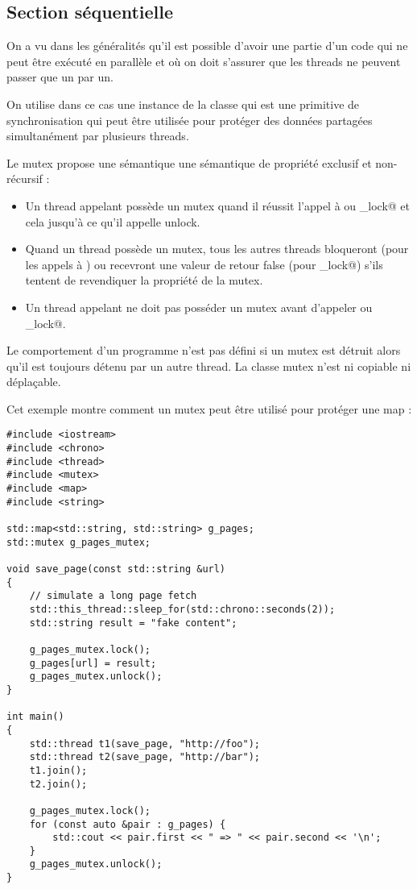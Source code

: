\documentclass[fleqn,11pt]{article}
\begin{document}
\subsection{Section séquentielle}

On a vu dans les généralités qu'il est possible d'avoir une partie d'un code qui ne peut être exécuté en parallèle et où on doit
s'assurer que les threads ne peuvent passer que un par un.

On utilise dans ce cas une instance de la classe \lstinline@mutex@ qui est une primitive de synchronisation qui peut être utilisée
pour protéger des données partagées simultanément par plusieurs threads.

Le mutex propose une sémantique une sémantique de propriété exclusif et non-récursif :

\begin{itemize}
\item Un thread appelant possède un mutex quand il réussit l'appel à 
\lstinline@lock@ ou \lstinline@try_lock@ et cela jusqu'à ce qu'il appelle unlock.
\item Quand un thread possède un mutex, tous les autres threads bloqueront (pour les appels à \lstinline@lock@) ou 
      recevront une valeur de retour false (pour \lstinline@try_lock@) s'ils tentent de revendiquer la propriété de la mutex.
\item Un thread appelant ne doit pas posséder un mutex avant d'appeler \lstinline@lock@ ou \lstinline@try_lock@. 
\end{itemize}

Le comportement d'un programme n'est pas défini si un mutex est détruit alors qu'il est toujours détenu par un autre thread. 
La classe mutex n'est ni copiable ni déplaçable.

Cet exemple montre comment un mutex peut être utilisé pour protéger une map :

\begin{lstlisting}
#include <iostream>
#include <chrono>
#include <thread>
#include <mutex>
#include <map>
#include <string>
 
std::map<std::string, std::string> g_pages;
std::mutex g_pages_mutex;
 
void save_page(const std::string &url)
{
    // simulate a long page fetch
    std::this_thread::sleep_for(std::chrono::seconds(2));
    std::string result = "fake content";
 
    g_pages_mutex.lock();
    g_pages[url] = result;
    g_pages_mutex.unlock();
}
 
int main() 
{
    std::thread t1(save_page, "http://foo");
    std::thread t2(save_page, "http://bar");
    t1.join();
    t2.join();
 
    g_pages_mutex.lock();
    for (const auto &pair : g_pages) {
        std::cout << pair.first << " => " << pair.second << '\n';
    }
    g_pages_mutex.unlock();
}
\end{lstlisting}
\end{document}
